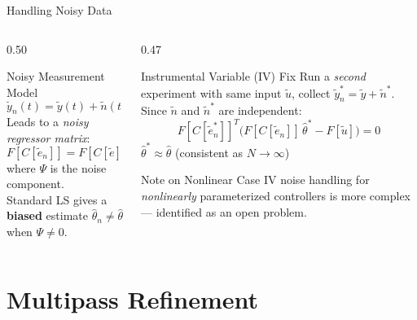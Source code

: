 \documentclass[aspectratio=169]{beamer}
\newcommand{\alerttext}[1]{{\color{alertred}\textbf{#1}}}
\begin{document}
\begin{frame}{Handling Noisy Data}
  \begin{columns}[T]
    \begin{column}{0.50\textwidth}
      \begin{alertblock}{Noisy Measurement Model}
        \[
          \tilde{y}_n(t) = \tilde{y}(t) + \tilde{n}(t)
        \]
        Leads to a \emph{noisy regressor matrix}:
        \[
          F[C[\tilde{e}_n]] = F[C[\tilde{e}]] + \Psi
        \]
        where $\Psi$ is the noise component.\\[0.4em]
        Standard LS gives a \alerttext{biased} estimate $\hat\theta_n \neq \hat\theta$ when $\Psi \neq 0$.
      \end{alertblock}
    \end{column}
    \begin{column}{0.47\textwidth}
      \begin{exampleblock}{Instrumental Variable (IV) Fix}
        Run a \emph{second} experiment with same input $\tilde{u}$, collect $\tilde{y}^*_n = \tilde{y} + \tilde{n}^*$.\\[0.3em]
        Since $\tilde{n}$ and $\tilde{n}^*$ are independent:
        \[
          F[C[\tilde{e}^*_n]]^T\bigl(F[C[\tilde{e}_n]]\,\hat\theta^* - F[\tilde{u}]\bigr) = 0
        \]
        $\hat\theta^* \approx \hat\theta$ (consistent as $N\to\infty$)
      \end{exampleblock}
      \vspace{0.3em}
      \begin{block}{Note on Nonlinear Case}
        IV noise handling for \emph{nonlinearly} parameterized controllers is more complex --- identified as an open problem.
      \end{block}
    \end{column}
  \end{columns}
\end{frame}

\section{Multipass Refinement}
\end{document}
